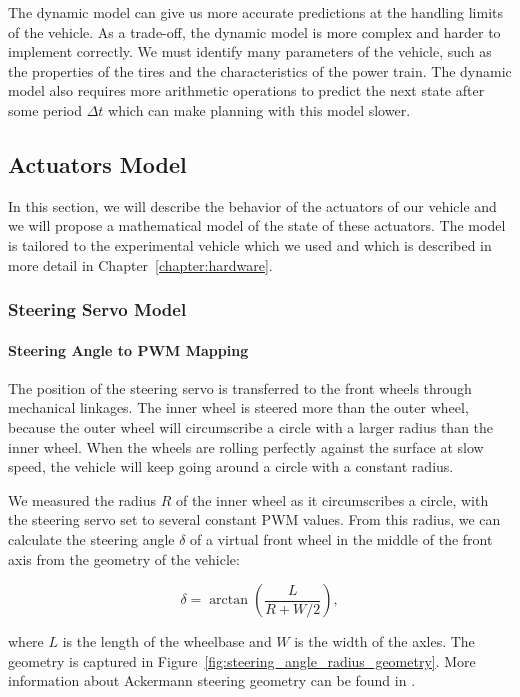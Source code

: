 The dynamic model can give us more accurate predictions at the handling limits of the vehicle. As a trade-off, the dynamic model is more complex and harder to implement correctly. We must identify many parameters of the vehicle, such as the properties of the tires and the characteristics of the power train. The dynamic model also requires more arithmetic operations to predict the next state after some period $\Delta t$ which can make planning with this model slower.

\subsection{Actuators Model}
\label{sec:actuators_model}

In this section, we will describe the behavior of the actuators of our vehicle and we will propose a mathematical model of the state of these actuators. The model is tailored to the experimental vehicle which we used and which is described in more detail in Chapter~\ref{chapter:hardware}.

\subsubsection{Steering Servo Model}

\paragraph{Steering Angle to PWM Mapping}

The position of the steering servo is transferred to the front wheels through mechanical linkages. The inner wheel is steered more than the outer wheel, because the outer wheel will circumscribe a circle with a larger radius than the inner wheel. When the wheels are rolling perfectly against the surface at slow speed, the vehicle will keep going around a circle with a constant radius.

We measured the radius $R$ of the inner wheel as it circumscribes a circle, with the steering servo set to several constant \gls{PWM} values. From this radius, we can calculate the steering angle $\delta$ of a virtual front wheel in the middle of the front axis from the geometry of the vehicle:

\begin{equation}
\delta=\arctan\left(\dfrac{L}{R+W/2}\right),
\end{equation}

where $L$ is the length of the wheelbase and $W$ is the width of the axles. The geometry is captured in Figure~\ref{fig:steering_angle_radius_geometry}. More information about Ackermann steering geometry can be found in \cite[Chapter~2]{rajamani}.

